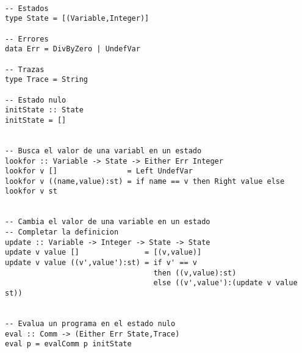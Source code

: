 \documentclass[12pt,a4paper]{article}
\begin{document}
\begin{verbatim}

-- Estados
type State = [(Variable,Integer)]

-- Errores
data Err = DivByZero | UndefVar

-- Trazas
type Trace = String

-- Estado nulo
initState :: State
initState = []


-- Busca el valor de una variabl en un estado
lookfor :: Variable -> State -> Either Err Integer
lookfor v []                = Left UndefVar
lookfor v ((name,value):st) = if name == v then Right value else lookfor v st


-- Cambia el valor de una variable en un estado
-- Completar la definicion
update :: Variable -> Integer -> State -> State
update v value []               = [(v,value)]
update v value ((v',value'):st) = if v' == v 
                                  then ((v,value):st)
                                  else ((v',value'):(update v value st))


-- Evalua un programa en el estado nulo
eval :: Comm -> (Either Err State,Trace)
eval p = evalComm p initState

\end{verbatim}
\newpage
\end{document}
